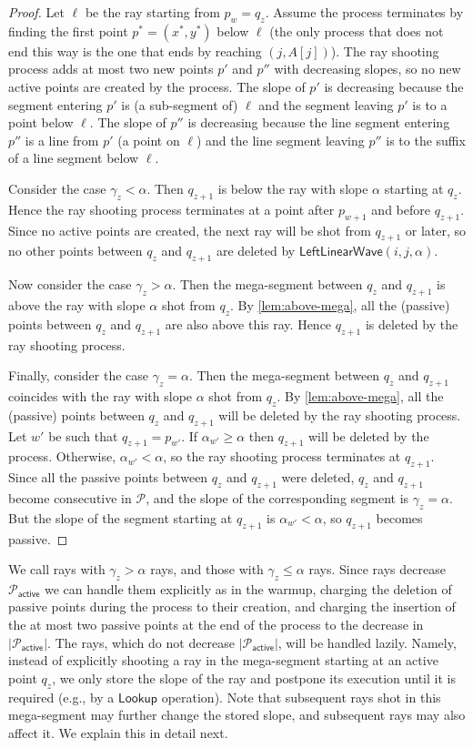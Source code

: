 \documentclass[10pt,a4paper]{article}
\newcommand{\LLW}{\mathsf{LeftLinearWave}}
\newcommand{\local}{\text{short }}
\newcommand{\longrange}{\text{long }}
\newcommand{\Lookup}{\mathsf{Lookup}}
\renewcommand{\P}{\mathcal{P}}
\newcommand{\AP}{\P_{\mathsf{active}}}
\begin{document}
\begin{proof}
Let $\ell$ be the ray starting from $p_w=q_z$. Assume the process terminates by finding the first point $p^* = (x^*,y^*)$ below $\ell$ (the only process that does not end this way is the one that ends by reaching $(j,A[j])$).
The ray shooting process adds at most two new points $p'$ and $p''$ with decreasing slopes, so no new active points are created by the process.
The slope of $p'$ is decreasing because the segment entering $p'$ is (a sub-segment of) $\ell$ and the segment leaving $p'$ is to a point below $\ell$.
The slope of $p''$ is decreasing because the line segment entering $p''$ is a line from $p'$ (a point on $\ell$) and the line segment leaving $p''$ is to the suffix of a line segment below $\ell$.
 
Consider the case $\gamma_z < \alpha$. Then $q_{z+1}$ is below the ray with slope $\alpha$ starting at $q_z$. 
Hence the ray shooting process terminates at a point after $p_{w+1}$ and before $q_{z+1}$. Since no active points are created, the next ray will be shot from $q_{z+1}$ or later, so no other points between $q_z$ and $q_{z+1}$ are deleted by $\LLW(i,j,\alpha)$. 

Now consider the case $\gamma_z > \alpha$. Then the mega-segment between $q_z$ and $q_{z+1}$ is above the ray with slope $\alpha$ shot from $q_z$. By \cref{lem:above-mega}, all the (passive) points between $q_z$ and $q_{z+1}$ are also above this ray. Hence $q_{z+1}$ is deleted by the ray shooting process.

Finally, consider the case $ \gamma_z=\alpha$. Then the mega-segment between $q_z$ and $q_{z+1}$ coincides with the ray with slope $\alpha$ shot from $q_z$. By \cref{lem:above-mega}, all the (passive) points between $q_z$ and $q_{z+1}$ will be deleted by the ray shooting process. Let $w'$ be such that $q_{z+1}=p_{w'}$. If $\alpha_{w'} \geq \alpha$ then $q_{z+1}$ will be deleted by the process. Otherwise, $\alpha_{w'} < \alpha$, so the ray shooting process terminates at $q_{z+1}$. Since all the passive points between $q_z$ and $q_{z+1}$ were deleted, $q_z$ and $q_{z+1}$ become consecutive in $\P$, and the slope of the corresponding segment is $\gamma_z = \alpha$. But the slope of the segment starting at $q_{z+1}$ is $\alpha_{w'} < \alpha$, so $q_{z+1}$ becomes passive.
\end{proof}

We call rays with $\gamma_z > \alpha$ \emph{\longrange}rays, and those with $\gamma_z \le \alpha$ \emph{\local}rays. Since \longrange rays decrease $\AP$ we can handle them explicitly as in the warmup, charging the deletion of passive points during the process to their creation, and charging the insertion of the at most two passive points at the end of the process to the decrease in $|\AP|$. The \local rays, which do not decrease $|\AP|$, will be handled lazily. Namely, instead of explicitly shooting a \local ray in the mega-segment starting at an active point $q_z$, we only store the slope of the ray and postpone its execution until it is required (e.g., by a $\Lookup$ operation). Note that subsequent \local rays shot in this mega-segment may further change the stored slope, and subsequent \longrange rays may also affect it. We explain this in detail next. 
\end{document}
